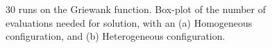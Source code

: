 \documentclass[conference]{IEEEtran}
\begin{document}
\begin{figure}[t]
    \centering
      \caption{ 30 runs on the Griewank function. Box-plot of the number of evaluations needed for solution,
                 with an (a) Homogeneous configuration, and (b) Heterogeneous configuration.}
    \label{fig:griewank-evals}
\end{figure}
%
\end{document}
